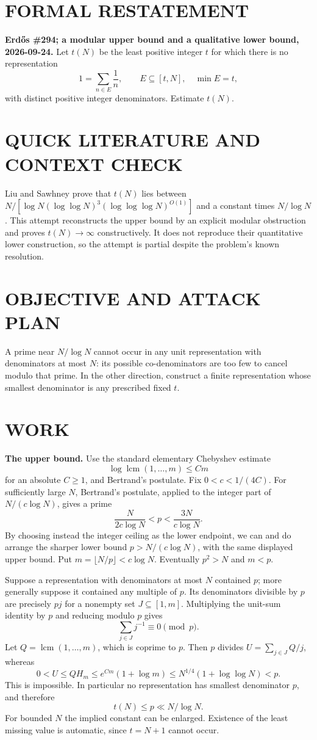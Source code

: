 \section{FORMAL RESTATEMENT}
\textbf{Erd\H{o}s \#294; a modular upper bound and a qualitative lower bound, 2026-09-24.}
Let $t(N)$ be the least positive integer $t$ for which there is no representation
\[
1=\sum_{n\in E}\frac1n,\qquad E\subseteq[t,N],\quad \min E=t,
\]
with distinct positive integer denominators. Estimate $t(N)$.

\section{QUICK LITERATURE AND CONTEXT CHECK}
Liu and Sawhney prove that $t(N)$ lies between $N/[\log N(\log\log N)^3(\log\log\log N)^{O(1)}]$ and a constant times $N/\log N$. This attempt reconstructs the upper bound by an explicit modular obstruction and proves $t(N)\to\infty$ constructively. It does not reproduce their quantitative lower construction, so the attempt is partial despite the problem's known resolution.

\section{OBJECTIVE AND ATTACK PLAN}
A prime near $N/\log N$ cannot occur in any unit representation with denominators at most $N$: its possible co-denominators are too few to cancel modulo that prime. In the other direction, construct a finite representation whose smallest denominator is any prescribed fixed $t$.

\section{WORK}
\textbf{The upper bound.} Use the standard elementary Chebyshev estimate
\[
\log\operatorname{lcm}(1,\ldots,m)\leq C m
\tag{1}
\]
for an absolute $C\geq1$, and Bertrand's postulate. Fix $0<c<1/(4C)$. For sufficiently large $N$, Bertrand's postulate, applied to the integer part of $N/(c\log N)$, gives a prime
\[
\frac{N}{2c\log N}<p<\frac{3N}{c\log N}.
\]
By choosing instead the integer ceiling as the lower endpoint, we can and do arrange the sharper lower bound $p>N/(c\log N)$, with the same displayed upper bound. Put $m=\lfloor N/p\rfloor<c\log N$. Eventually $p^2>N$ and $m<p$.

Suppose a representation with denominators at most $N$ contained $p$; more generally suppose it contained any multiple of $p$. Its denominators divisible by $p$ are precisely $pj$ for a nonempty set $J\subseteq[1,m]$. Multiplying the unit-sum identity by $p$ and reducing modulo $p$ gives
\[
\sum_{j\in J}j^{-1}\equiv0\pmod p.
\tag{2}
\]
Let $Q=\operatorname{lcm}(1,\ldots,m)$, which is coprime to $p$. Then $p$ divides $U=\sum_{j\in J}Q/j$, whereas
\[
0<U\leq QH_m\leq e^{Cm}(1+\log m)
\leq N^{1/4}(1+\log\log N)<p.
\]
This is impossible. In particular no representation has smallest denominator $p$, and therefore
\[
t(N)\leq p\ll N/\log N.
\tag{3}
\]
For bounded $N$ the implied constant can be enlarged. Existence of the least missing value is automatic, since $t=N+1$ cannot occur.

